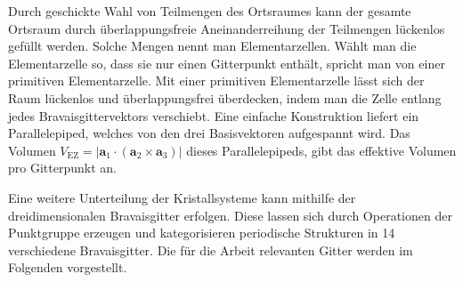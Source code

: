 Durch geschickte Wahl von Teilmengen des Ortsraumes kann der gesamte Ortsraum durch überlappungsfreie Aneinanderreihung
der Teilmengen lückenlos gefüllt werden.
Solche Mengen nennt man Elementarzellen.
Wählt man die Elementarzelle so, dass sie nur einen Gitterpunkt enthält, spricht man von einer primitiven
Elementarzelle.
Mit einer primitiven Elementarzelle lässt sich der Raum lückenlos und überlappungsfrei überdecken, indem man die Zelle
entlang jedes Bravaisgittervektors verschiebt.
Eine einfache Konstruktion liefert ein Parallelepiped, welches von den drei Basisvektoren aufgespannt wird.
Das Volumen $V_\mathrm{EZ}= \lvert \mathbf{a}_1 \cdot (\mathbf{a}_2 \times  \mathbf{a}_3) \rvert$ dieses
Parallelepipeds, gibt das effektive Volumen pro Gitterpunkt an.
\autocite[90-91]{Ashcroft}

Eine weitere Unterteilung der Kristallsysteme kann mithilfe der dreidimensionalen Bravaisgitter erfolgen.
Diese lassen sich durch Operationen der Punktgruppe erzeugen und kategorisieren periodische Strukturen
in 14 verschiedene Bravaisgitter. \autocite[37]{Grundmann}
Die für die Arbeit relevanten Gitter werden im Folgenden vorgestellt.

